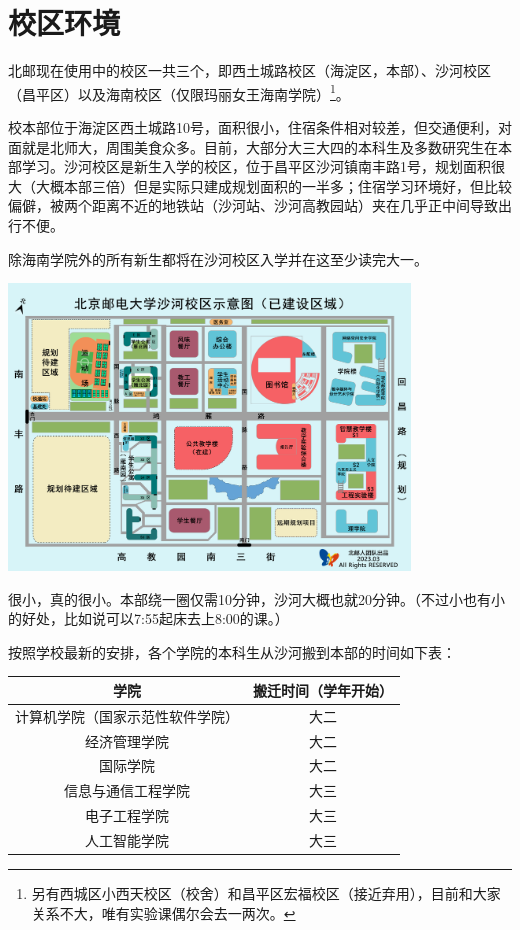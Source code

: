 \section{校区环境}

北邮现在使用中的校区一共三个，即西土城路校区（海淀区，本部）、沙河校区（昌平区）以及海南校区（仅限玛丽女王海南学院）\footnote{另有西城区小西天校区（校舍）和昌平区宏福校区（接近弃用），目前和大家关系不大，唯有实验课偶尔会去一两次。}。

校本部位于海淀区西土城路10号，面积很小，住宿条件相对较差，但交通便利，对面就是北师大，周围美食众多。目前，大部分大三大四的本科生及多数研究生在本部学习。沙河校区是新生入学的校区，位于昌平区沙河镇南丰路1号，规划面积很大（大概本部三倍）但是实际只建成规划面积的一半多；住宿学习环境好，但比较偏僻，被两个距离不近的地铁站（沙河站、沙河高教园站）夹在几乎正中间导致出行不便。

除海南学院外的所有新生都将在沙河校区入学并在这至少读完大一。

\begin{center}
    \includegraphics[width=0.80\textwidth]{images/shahe-map.jpg}
\end{center}


很小，真的很小。本部绕一圈仅需10分钟，沙河大概也就20分钟。{\small （不过小也有小的好处，比如说可以7:55起床去上8:00的课。）}


按照学校最新的安排，各个学院的本科生从沙河搬到本部的时间如下表：

\begin{center}
    \begin{tabular}{cc}
        \toprule
        学院 & 搬迁时间（学年开始） \\
        \midrule
        计算机学院（国家示范性软件学院） & 大二 \\
        经济管理学院 & 大二 \\
        国际学院 & 大二\\
        信息与通信工程学院 & 大三 \\
        电子工程学院 & 大三 \\
        人工智能学院 & 大三 \\
        \bottomrule
    \end{tabular}
\end{center}

